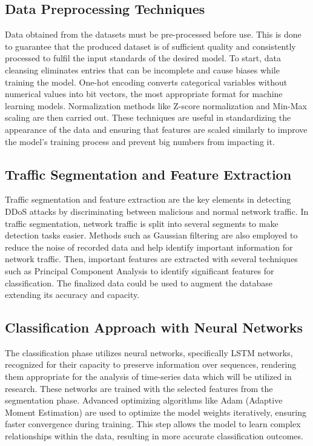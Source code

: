 \documentclass[a4paper, 12pt]{article}
\begin{document}
\subsection{ Data Preprocessing Techniques }

Data obtained from the datasets must be pre-processed before use. This is done to guarantee that the produced dataset is of sufficient quality and consistently processed to fulfil the input standards of the desired model. To start, data cleansing eliminates entries that can be incomplete and cause biases while training the model. One-hot encoding converts categorical variables without numerical values into bit vectors, the most appropriate format for machine learning models.  Normalization methods like Z-score normalization and Min-Max scaling are then carried out. These techniques are useful in standardizing the appearance of the data and ensuring that features are scaled similarly to improve the model's training process and prevent big numbers from impacting it.

\subsection{ Traffic Segmentation and Feature Extraction }

Traffic segmentation and feature extraction are the key elements in detecting DDoS attacks by discriminating between malicious and normal network traffic. In traffic segmentation, network traffic is split into several segments to make detection tasks easier. Methods such as Gaussian filtering are also employed to reduce the noise of recorded data and help identify important information for network traffic.  Then, important features are extracted with several techniques such as Principal Component Analysis to identify significant features for classification. The finalized data could be used to augment the database extending its accuracy and capacity.

\subsection{ Classification Approach with Neural Networks }

The classification phase utilizes neural networks, specifically LSTM networks, recognized for their capacity to preserve information over sequences, rendering them appropriate for the analysis of time-series data which will be utilized in research\cite {2}. These networks are trained with the selected features from the segmentation phase. Advanced optimizing algorithms like Adam (Adaptive Moment Estimation) are used to optimize the model weights iteratively, ensuring faster convergence during training.  This step allows the model to learn complex relationships within the data, resulting in more accurate classification outcomes.
\end{document}
